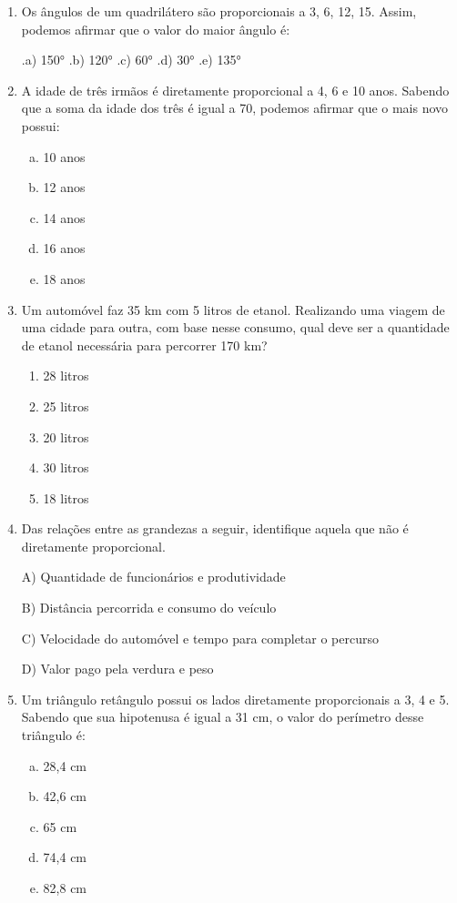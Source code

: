 \begin{multicols*}{2}
\begin{enumerate}[wide, labelwidth=!, labelindent=0pt]
		\item Os ângulos de um quadrilátero são proporcionais a 3, 6, 12, 15. Assim, podemos afirmar que o valor do maior ângulo é:

		      .a) 150°  .b) 120°  .c) 60°  .d) 30°  .e) 135°

		\item A idade de três irmãos é diretamente proporcional a 4, 6 e 10 anos. Sabendo que a soma da idade dos três é igual a 70, podemos afirmar que o mais novo possui:

		\begin{enumerate}[(a)]
			\item 10 anos
			\item 12 anos
			\item 14 anos
			\item 16 anos
			\item 18 anos
		\end{enumerate}

		\item Um automóvel faz 35 km com 5 litros de etanol. Realizando uma viagem de uma cidade para outra, com base nesse consumo, qual deve ser a quantidade de etanol necessária para percorrer 170 km?
		
			\begin{enumerate}
		      \item 28 litros
		      \item 25 litros
		      \item 20 litros
		      \item 30 litros
		      \item 18 litros
			\end{enumerate}

		\item Das relações entre as grandezas a seguir, identifique aquela que não é diretamente proporcional.

		      A) Quantidade de funcionários e produtividade

		      B) Distância percorrida e consumo do veículo

		      C) Velocidade do automóvel e tempo para completar o percurso

		      D) Valor pago pela verdura e peso

		\item Um triângulo retângulo possui os lados diretamente proporcionais a 3, 4 e 5. Sabendo que sua hipotenusa é igual a 31 cm, o valor do perímetro desse triângulo é:
		\begin{enumerate}[(a)]
			\item 28,4 cm
			\item 42,6 cm
			\item 65 cm
			\item 74,4 cm
			\item 82,8 cm
		\end{enumerate}


\end{enumerate}
\end{multicols*}
